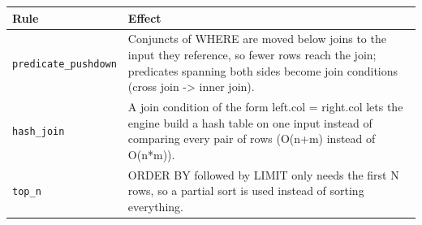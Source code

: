 \begin{longtable}{@{}lp{}@{}}\toprule
\textbf{Rule} & \textbf{Effect}\\ \midrule\endhead
\texttt{predicate\_pushdown} & Conjuncts of WHERE are moved below joins to the input they reference, so fewer rows reach the join; predicates spanning both sides become join conditions (cross join -\textgreater{} inner join).\\
\texttt{hash\_join} & A join condition of the form left.col = right.col lets the engine build a hash table on one input instead of comparing every pair of rows (O(n+m) instead of O(n*m)).\\
\texttt{top\_n} & ORDER BY followed by LIMIT only needs the first N rows, so a partial sort is used instead of sorting everything.\\
\bottomrule
\end{longtable}
